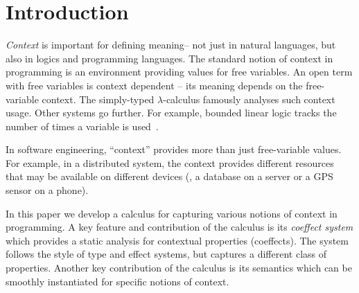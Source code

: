\newcommand{\sflat}{\star}


\newcommand{\amerge}{ \textcolor{aclr}{ \mathbin{\rotatebox[origin=c]{-90}{$\ltimes$}} } }
\newcommand{\asplit}{ \textcolor{aclr}{ \mathbin{\rotatebox[origin=c]{90}{$\ltimes$}} } }
\newcommand{\azero}{ \textcolor{aclr}{\bot} }
\newcommand{\aunit}{ \alift{\cunit} } %
\newcommand{\aweak}{ \alift{\czero} } %

\newcommand{\fcons}{ \times } 
\newcommand{\fempty}{\epsilon}



\section{Introduction}

\emph{Context} is important for defining meaning-- not just in natural languages, but also in logics and 
programming languages.
The standard notion of context in programming is an environment 
providing values for free variables. An open term with free variables is context dependent -- its 
meaning depends on the free-variable context. The simply-typed $\lambda$-calculus famously 
analyses such context usage. 
Other systems go further. %
For example, bounded linear logic tracks the number of times a 
variable is used~\cite{girard1992bounded}.

In software engineering, ``context'' provides more than just free-variable values. For example, in a
distributed system, the context provides different resources that may be available on different 
devices (\eg{}, a database on a server or a GPS sensor on a phone).

In this paper we develop a calculus for capturing various notions of 
context in programming. A key feature and contribution
of the calculus is its \emph{coeffect system} which provides a static analysis for contextual properties (coeffects). The system
follows the style of type and effect systems, but captures a different class of properties. %
Another key contribution of the calculus is its semantics which can be smoothly instantiated for specific notions of context.

